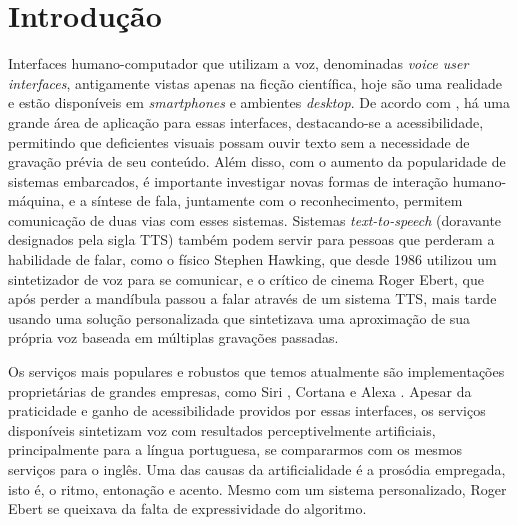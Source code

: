 

\chapter{Introdução}

Interfaces humano-computador que utilizam a voz, denominadas \emph{voice user interfaces}, antigamente vistas apenas na ficção científica, hoje são uma realidade e estão disponíveis em \emph{smartphones} e ambientes \emph{desktop}. De acordo com \textcite{tts-book, martinjurafsky}, há uma grande área de aplicação para essas interfaces, destacando-se a acessibilidade, permitindo que deficientes visuais possam ouvir texto sem a necessidade de gravação prévia de seu conteúdo. Além disso, com o aumento da popularidade de sistemas embarcados, é importante investigar novas formas de interação humano-máquina, e a síntese de fala, juntamente com o reconhecimento, permitem comunicação de duas vias com esses sistemas. Sistemas \emph{text-to-speech} (doravante designados pela sigla TTS) também podem servir para pessoas que perderam a habilidade de falar, como o físico Stephen Hawking, que desde 1986 utilizou um sintetizador de voz para se comunicar, e o crítico de cinema Roger Ebert, que após perder a mandíbula passou a falar através de um sistema TTS, mais tarde usando uma solução personalizada que sintetizava uma aproximação de sua própria voz baseada em múltiplas gravações passadas. 

Os serviços mais populares e robustos que temos atualmente são implementações proprietárias de grandes empresas, como Siri \parencite{siri}, Cortana \parencite{cortana} e Alexa \parencite{alexa}. Apesar da praticidade e ganho de acessibilidade providos por essas interfaces, os serviços disponíveis sintetizam voz com resultados perceptivelmente artificiais, principalmente para a língua portuguesa, se compararmos com os mesmos serviços para o inglês. Uma das causas da artificialidade é a prosódia empregada, isto é, o ritmo, entonação e acento. Mesmo com um sistema personalizado, Roger Ebert se queixava da falta de expressividade do algoritmo.

